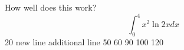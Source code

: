 \documentclass{article}
\begin{document}
How well does this work?
$$\int_0^4 x^2 \ln{2x}dx$$
20
new line
additional line
50
60
90
100
120
\end{document}
